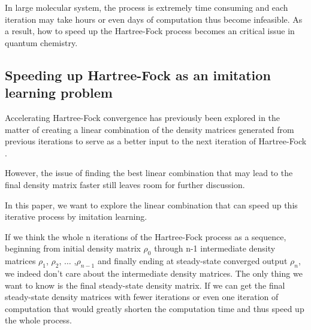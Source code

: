 \documentclass[twoside]{article}
\begin{document}
In large molecular system, the process is extremely time consuming and each iteration may take hours or even days of computation thus become infeasible. 
As a result, how to speed up the Hartree-Fock process becomes an critical issue in quantum chemistry.



\subsection{Speeding up Hartree-Fock as an imitation learning problem}


Accelerating Hartree-Fock convergence has previously been explored in the matter of creating a linear combination of the density matrices generated from previous iterations to serve as a better input to the next iteration of Hartree-Fock \cite{Pulay1980}. 


However, the issue of finding the best linear combination that may lead to the final density matrix faster still leaves room for further discussion.

In this paper,
we want to explore the linear combination that can speed up this iterative process by imitation learning. 






If we think the whole n iterations of the Hartree-Fock process as a sequence, beginning from initial density matrix $\rho_0$ through n-1 intermediate density matrices $\rho_1$,  $\rho_2$,  $\ldots$ ,$\rho_{n-1}$ and finally ending at steady-state converged output $\rho_{n}$, we indeed don't care about the intermediate density matrices. The only thing we want to know is the final steady-state density matrix. If we can get the final steady-state density matrices with fewer iterations or even one iteration of computation that would greatly shorten the computation time and thus speed up the whole process. 
\end{document}
